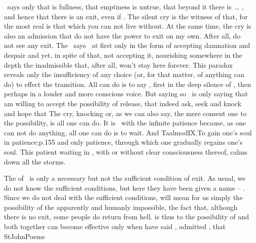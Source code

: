 \label{pre:humility}%
\Yes\ says only that  is fullness, that emptiness is untrue, that beyond it there is~\ldots
{}, and hence that there is an exit, even if . The
silent cry  is the witness of that, for the most real is that
which you can not live without. At the same time, the cry is also an admission
that  do not have the power to exit on my own. After all,  do not
see any exit. The \sch\ says \yes\ at first only in the form of accepting
damnation and despair and yet, in spite of that, not accepting it, nourishing
somewhere in the depth the inadmissible  that, after all,  won't
stay here forever. This paradox reveals only the insufficiency of any
 choice (or, for that matter, of anything  can do) to effect
the transition. All  can do is to say \Yes, first in the deep silence of
, then perhaps in a louder and more conscious voice. But saying
so \yes\ is only saying that  am willing to accept the possibility of
release, that  indeed ask, seek and knock and hope that  The cry, knocking or, as we can also say, the mere
    consent  one to the possibility, is all 
one can do. It is \equi\ with the infinite patience because, as one can
not do anything, all one can do is to wait. And \citet{it is necessary that one
  has the patience to begin so, that one in truth admits, that it is a feat of
  patience}{Taalmod}{IX.To gain one's soul in patience;p.155} and only patience,
    through which one gradually regains one's soul. This patient waiting in
    , with or without clear consciousness thereof, calms down all
    the storms. 


\label{pre:thankful}%
The  of \yes\ is only a necessary but not the sufficient condition of
exit. As usual, we do not know the sufficient conditions, but here they have
been given a name -- . Since we do not deal with the sufficient conditions,
 will mean for us simply the possibility of the apparently and humanly
impossible, the fact that, although there is no  exit, some people
do return from hell.   is thus  to the possibility of
 and both together can become effective only when  have said
\Yes, admitted , that \citet{I live yet do not live
  in me.}{StJohnPoems}{}

